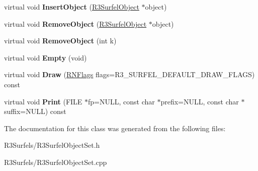 \begin{DoxyCompactItemize}
\item 
virtual void {\bfseries Insert\+Object} (\hyperlink{class_r3_surfel_object}{R3\+Surfel\+Object} $\ast$object)\hypertarget{class_r3_surfel_object_set_abbef77fb6ec0276fee6d24918aabc8e0}{}\label{class_r3_surfel_object_set_abbef77fb6ec0276fee6d24918aabc8e0}

\item 
virtual void {\bfseries Remove\+Object} (\hyperlink{class_r3_surfel_object}{R3\+Surfel\+Object} $\ast$object)\hypertarget{class_r3_surfel_object_set_abcf1adf27e002179346e16c383a97811}{}\label{class_r3_surfel_object_set_abcf1adf27e002179346e16c383a97811}

\item 
virtual void {\bfseries Remove\+Object} (int k)\hypertarget{class_r3_surfel_object_set_ab1a3e6075af116f44370bfcbec24f6a8}{}\label{class_r3_surfel_object_set_ab1a3e6075af116f44370bfcbec24f6a8}

\item 
virtual void {\bfseries Empty} (void)\hypertarget{class_r3_surfel_object_set_a20db111fc5a2555b8610dba807222c79}{}\label{class_r3_surfel_object_set_a20db111fc5a2555b8610dba807222c79}

\item 
virtual void {\bfseries Draw} (\hyperlink{class_r_n_flags}{R\+N\+Flags} flags=R3\+\_\+\+S\+U\+R\+F\+E\+L\+\_\+\+D\+E\+F\+A\+U\+L\+T\+\_\+\+D\+R\+A\+W\+\_\+\+F\+L\+A\+GS) const \hypertarget{class_r3_surfel_object_set_aa20de2043fc5030248548f23558953f1}{}\label{class_r3_surfel_object_set_aa20de2043fc5030248548f23558953f1}

\item 
virtual void {\bfseries Print} (F\+I\+LE $\ast$fp=N\+U\+LL, const char $\ast$prefix=N\+U\+LL, const char $\ast$suffix=N\+U\+LL) const \hypertarget{class_r3_surfel_object_set_ac43f74b75fdde2f2ac59018434828bdb}{}\label{class_r3_surfel_object_set_ac43f74b75fdde2f2ac59018434828bdb}

\end{DoxyCompactItemize}


The documentation for this class was generated from the following files\+:\begin{DoxyCompactItemize}
\item 
R3\+Surfels/R3\+Surfel\+Object\+Set.\+h\item 
R3\+Surfels/R3\+Surfel\+Object\+Set.\+cpp\end{DoxyCompactItemize}
